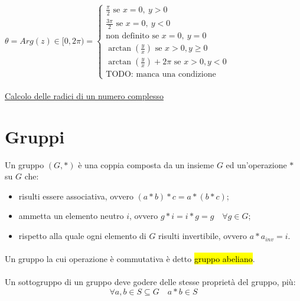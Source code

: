 \documentclass[a4paper]{article}
\begin{document}
        $
                \theta = Arg(z) \in [0,2\pi) = \begin{cases}
                        \frac{\pi}{2} \mbox{ se } x = 0, \ y > 0 \\
                        \frac{3\pi}{2} \mbox{ se } x = 0, \ y < 0 \\
                        \mbox{non definito se } x = 0, \ y = 0 \\
                        \arctan{\left(\frac{y}{x}\right)} \mbox{ se } x > 0 , y \ge 0 \\
                        \arctan{\left(\frac{y}{x}\right)} + 2 \pi \mbox{ se } x > 0, y < 0 \\
                        \mbox{TODO: manca una condizione}
                \end{cases}
        $

        \paragraph{}
        \href{http://www.youmath.it/lezioni/analisi-matematica/numeri-complessi/760-calcolare-le-radici-di-un-numero-complesso.html}{Calcolo delle radici di un numero complesso}


        \newpage
        \section*{Gruppi}
        Un gruppo $(G, \ast)$ \`{e} una coppia composta da un insieme $G$ ed un'operazione $\ast$ su $G$ che:
        \begin{itemize}
                \item risulti essere associativa, ovvero $(a \ast b) \ast c = a \ast (b \ast c)$;
                \item ammetta un elemento neutro $i$, ovvero $g \ast i = i \ast g = g \quad \forall g \in G$;
                \item rispetto alla quale ogni elemento di $G$ risulti invertibile, ovvero $a \ast a_{inv} = i$.
        \end{itemize}

        \paragraph{}
        Un gruppo la cui operazione \`{e} commutativa \`{e} detto \hl{gruppo abeliano}.

        \paragraph{}
        Un sottogruppo di un gruppo deve godere delle stesse propriet\`{a} del gruppo, pi\`{u}:
        \[ \forall a,b \in S \subseteq G \quad a \ast b \in S\]
\end{document}

